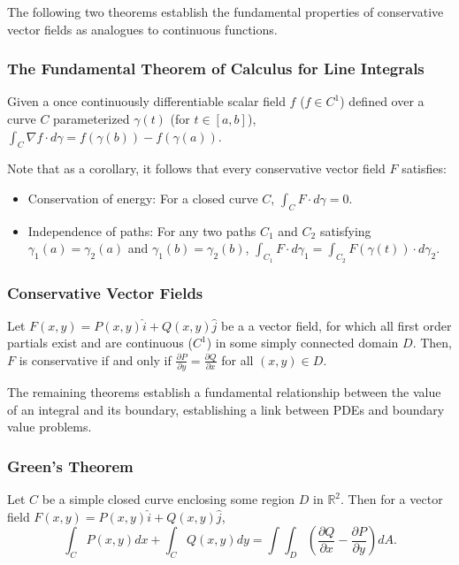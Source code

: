 \documentclass[12pt]{article}
\begin{document}
The following two theorems establish the fundamental properties of conservative
vector fields as analogues to continuous functions.

\subsubsection*{The Fundamental Theorem of Calculus for Line Integrals}

Given a once continuously differentiable scalar field $f$ ($f\in C^1$)
defined over a curve $C$ parameterized $\gamma(t)$ (for $t\in[a,b]$), 
$\int_C \nabla f \cdot d\gamma = f(\gamma(b)) - f(\gamma(a))$.

Note that as a corollary, it follows that every conservative vector field
$F$ satisfies:
\begin{itemize}
\item Conservation of energy: For a closed curve $C$, 
$\int_C F \cdot d\gamma = 0$.
\item Independence of paths: For any two paths $C_1$ and $C_2$ satisfying 
$\gamma_1(a) = \gamma_2(a)$ and $\gamma_1(b) = \gamma_2(b)$,
$\int_{C_1} F \cdot d\gamma_1 = \int_{C_2} F(\gamma(t)) \cdot d\gamma_2$.
\end{itemize}

\subsubsection*{Conservative Vector Fields}

Let $F(x,y) = P(x,y)\hat{i} + Q(x,y)\hat{j}$ be a a vector field, for which
all first order partials exist and are continuous ($C^1$) in some simply
connected domain $D$. Then, $F$ is conservative if and only if
$\frac{\partial P}{\partial y} = \frac{\partial Q}{\partial x}$ for all 
$(x,y) \in D$.

\bigskip\medskip

The remaining theorems establish a fundamental relationship between the value
of an integral and its boundary, establishing a link between PDEs and
boundary value problems.

\subsubsection*{Green's Theorem}

Let $C$ be a simple closed curve enclosing some region $D$ in $\mathbb{R}^2$.
Then for a vector field $F(x,y) = P(x,y)\hat{i} + Q(x,y)\hat{j}$,
$$
\int_C P(x,y) dx + \int_C Q(x,y) dy = \int\int_D 
\left(\frac{\partial Q}{\partial x} - \frac{\partial P}{\partial y}\right) dA.
$$
\end{document}
